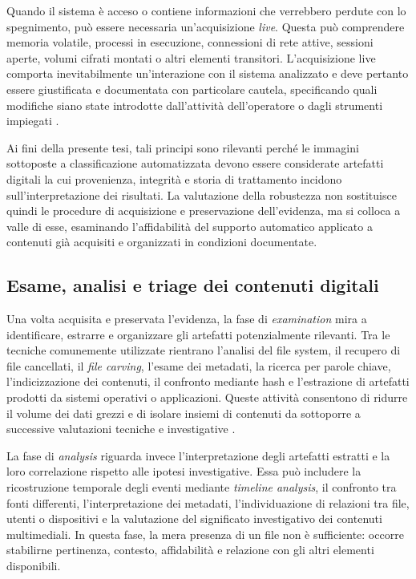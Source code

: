 Quando il sistema è acceso o contiene informazioni che verrebbero perdute con lo spegnimento, può essere necessaria un'acquisizione \textit{live}. Questa può comprendere memoria volatile, processi in esecuzione, connessioni di rete attive, sessioni aperte, volumi cifrati montati o altri elementi transitori. L'acquisizione live comporta inevitabilmente un'interazione con il sistema analizzato e deve pertanto essere giustificata e documentata con particolare cautela, specificando quali modifiche siano state introdotte dall'attività dell'operatore o dagli strumenti impiegati \cite{nist2006guide,casey2011digital}.

Ai fini della presente tesi, tali principi sono rilevanti perché le immagini sottoposte a classificazione automatizzata devono essere considerate artefatti digitali la cui provenienza, integrità e storia di trattamento incidono sull'interpretazione dei risultati. La valutazione della robustezza non sostituisce quindi le procedure di acquisizione e preservazione dell'evidenza, ma si colloca a valle di esse, esaminando l'affidabilità del supporto automatico applicato a contenuti già acquisiti e organizzati in condizioni documentate.


\subsection{Esame, analisi e triage dei contenuti digitali}
\label{subsec:background_examination_analysis}
Una volta acquisita e preservata l'evidenza, la fase di \textit{examination} mira a identificare, estrarre e organizzare gli artefatti potenzialmente rilevanti. Tra le tecniche comunemente utilizzate rientrano l'analisi del file system, il recupero di file cancellati, il \textit{file carving}, l'esame dei metadati, la ricerca per parole chiave, l'indicizzazione dei contenuti, il confronto mediante hash e l'estrazione di artefatti prodotti da sistemi operativi o applicazioni. Queste attività consentono di ridurre il volume dei dati grezzi e di isolare insiemi di contenuti da sottoporre a successive valutazioni tecniche e investigative \cite{carrier2005filesystem,casey2011digital,nist2006guide}.

La fase di \textit{analysis} riguarda invece l'interpretazione degli artefatti estratti e la loro correlazione rispetto alle ipotesi investigative. Essa può includere la ricostruzione temporale degli eventi mediante \textit{timeline analysis}, il confronto tra fonti differenti, l'interpretazione dei metadati, l'individuazione di relazioni tra file, utenti o dispositivi e la valutazione del significato investigativo dei contenuti multimediali. In questa fase, la mera presenza di un file non è sufficiente: occorre stabilirne pertinenza, contesto, affidabilità e relazione con gli altri elementi disponibili.

